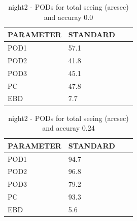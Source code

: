 \begin{table}[p!]
\begin{center}
\begin{tabular}{|l|l|l|l|}
\hline
\multicolumn{1}{|c|}{\cellcolor[HTML]{C0C0C0}\textbf{PARAMETER}} & \multicolumn{1}{c|}{\cellcolor[HTML]{C0C0C0}\textbf{STANDARD}}\\
\hline
\cellcolor[HTML]{C0C0C0}POD1  & 57.1                                \\
\cellcolor[HTML]{C0C0C0}POD2  & 41.8                                \\
\cellcolor[HTML]{C0C0C0}POD3  & 45.1                                \\
\cellcolor[HTML]{C0C0C0}PC    & 47.8                                  \\
\cellcolor[HTML]{C0C0C0}EBD   & 7.7                                 \\
\hline
\end{tabular}
\caption{night2 - PODs for total seeing (arcsec) and accuray 0.0}
\label{tab:podsee0.0:night2}
\end{center}
\end{table}
\begin{table}[p!]
\begin{center}
\begin{tabular}{|l|l|l|l|}
\hline
\multicolumn{1}{|c|}{\cellcolor[HTML]{C0C0C0}\textbf{PARAMETER}} & \multicolumn{1}{c|}{\cellcolor[HTML]{C0C0C0}\textbf{STANDARD}}\\
\hline
\cellcolor[HTML]{C0C0C0}POD1  & 94.7                                \\
\cellcolor[HTML]{C0C0C0}POD2  & 96.8                                \\
\cellcolor[HTML]{C0C0C0}POD3  & 79.2                                \\
\cellcolor[HTML]{C0C0C0}PC    & 93.3                                  \\
\cellcolor[HTML]{C0C0C0}EBD   & 5.6                                 \\
\hline
\end{tabular}
\caption{night2 - PODs for total seeing (arcsec) and accuray 0.24}
\label{tab:podsee0.24:night2}
\end{center}
\end{table}
